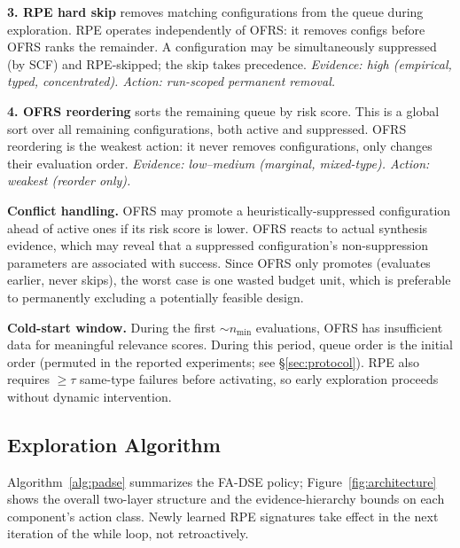 \documentclass[journal]{IEEEtran}
\begin{document}
\textbf{3. RPE hard skip} removes matching configurations from the queue during exploration. RPE operates independently of OFRS: it removes configs before OFRS ranks the remainder. A configuration may be simultaneously suppressed (by SCF) and RPE-skipped; the skip takes precedence. \emph{Evidence: high (empirical, typed, concentrated). Action: run-scoped permanent removal.}

\textbf{4. OFRS reordering} sorts the remaining queue by risk score. This is a global sort over all remaining configurations, both active and suppressed. OFRS reordering is the weakest action: it never removes configurations, only changes their evaluation order. \emph{Evidence: low--medium (marginal, mixed-type). Action: weakest (reorder only).}

\textbf{Conflict handling.} OFRS may promote a heuristically-suppressed configuration ahead of active ones if its risk score is lower. OFRS reacts to actual synthesis evidence, which may reveal that a suppressed configuration's non-suppression parameters are associated with success. Since OFRS only promotes (evaluates earlier, never skips), the worst case is one wasted budget unit, which is preferable to permanently excluding a potentially feasible design.

\textbf{Cold-start window.} During the first $\sim n_{\min}$ evaluations, OFRS has insufficient data for meaningful relevance scores. During this period, queue order is the initial order (permuted in the reported experiments; see \S\ref{sec:protocol}). RPE also requires $\geq \tau$ same-type failures before activating, so early exploration proceeds without dynamic intervention.

\subsection{Exploration Algorithm}

Algorithm~\ref{alg:padse} summarizes the FA-DSE policy; Figure~\ref{fig:architecture} shows the overall two-layer structure and the evidence-hierarchy bounds on each component's action class. Newly learned RPE signatures take effect in the next iteration of the while loop, not retroactively.
\end{document}
